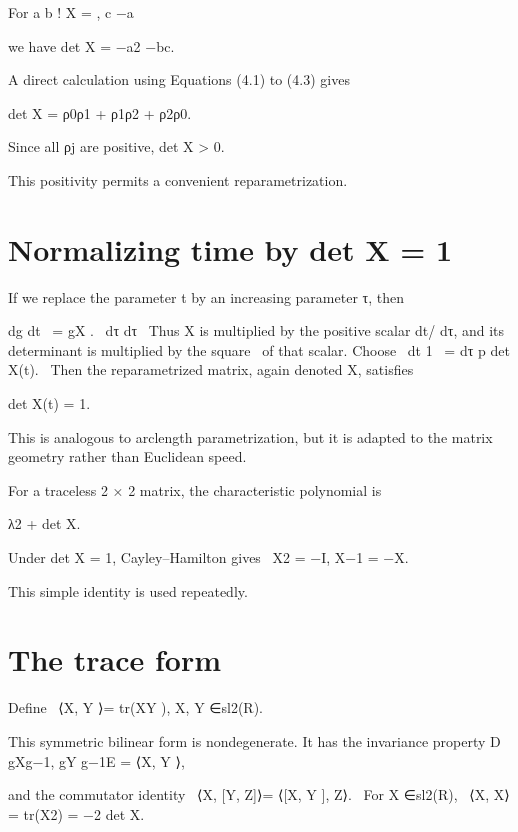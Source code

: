 For a b ! X = , c −a


we have det X = −a2 −bc.


A direct calculation using Equations (4.1) to (4.3) gives


\begin{displaytext}
det X = ρ0ρ1 + ρ1ρ2 + ρ2ρ0.
\end{displaytext}

Since all ρj are positive, det X > 0.


This positivity permits a convenient reparametrization.


\section{Normalizing time by det X = 1}

If we replace the parameter t by an increasing parameter τ, then


\begin{displaytext}
dg dt \
= gX . \
dτ dτ \
Thus X is multiplied by the positive scalar dt/ dτ, and its determinant is multiplied by the square \
of that scalar. Choose \
dt 1 \
= dτ p det X(t). \
Then the reparametrized matrix, again denoted X, satisfies
\end{displaytext}

det X(t) = 1.


This is analogous to arclength parametrization, but it is adapted to the matrix geometry rather than Euclidean speed.


For a traceless 2 × 2 matrix, the characteristic polynomial is


λ2 + det X.


\begin{displaytext}
Under det X = 1, Cayley–Hamilton gives \
X2 = −I, X−1 = −X.
\end{displaytext}

This simple identity is used repeatedly.


\section{The trace form}

\begin{displaytext}
Define \
⟨X, Y ⟩= tr(XY ), X, Y ∈sl2(R).
\end{displaytext}

This symmetric bilinear form is nondegenerate. It has the invariance property D gXg−1, gY g−1E = ⟨X, Y ⟩,


\begin{displaytext}
and the commutator identity \
⟨X, [Y, Z]⟩= ⟨[X, Y ], Z⟩. \
For X ∈sl2(R), \
⟨X, X⟩= tr(X2) = −2 det X.
\end{displaytext}

